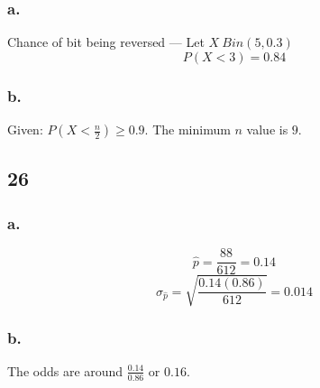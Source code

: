 \documentclass[11pt]{article}
\begin{document}
\subsubsection*{a.}
Chance of bit being reversed --- Let $X~Bin(5, 0.3)$ 
\[P(X<3) = 0.84 \]

\subsubsection*{b.}
Given: $P(X<\frac{n}{2}) \ge 0.9$. The minimum $n$ value is $9$.
\subsection*{26}
\subsubsection*{a.}
\[\hat{p} = \frac{88}{612} = 0.14 \]
\[\sigma_{\hat{p}} = \sqrt{\frac{0.14(0.86)}{612}} = 0.014 \]
\subsubsection*{b.}
The odds are around $\frac{0.14}{0.86}$ or $0.16$.
\end{document}
